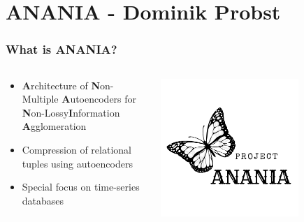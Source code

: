 \section{ANANIA - Dominik Probst}

\begin{frame}
	\frametitle{What is ANANIA?}

	\begin{columns}
		\begin{column}{0.7\textwidth}
			\begin{itemize}
				\item \textbf{A}rchitecture of \textbf{N}on-Multiple \textbf{A}utoencoders for {\color{darkgray}\textbf{N}on-Lossy}\footnotemark \textbf{I}nformation \textbf{A}gglomeration
				\item Compression of relational tuples using autoencoders
				\item Special focus on time-series databases
			\end{itemize}
		\end{column}
		\begin{column}{0.3\textwidth}
			\vspace*{-3em}
			\begin{flushright}
				\includegraphics[width=0.7\textwidth]{img/research/project-anania-logo.pdf}
			\end{flushright}
		\end{column}
	\end{columns}

\end{frame}

